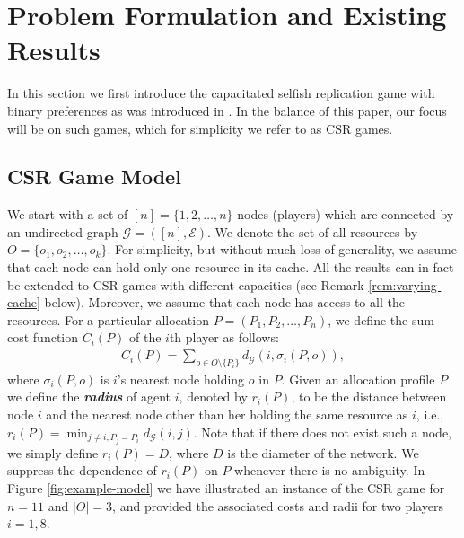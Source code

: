 
\section{Problem Formulation and Existing Results}\label{sec:game-model}

In this section we first introduce the capacitated selfish replication game with binary preferences as was introduced in \cite{gopalakrishnan2012cache}. In the balance of this paper, our focus will be on such games, which for simplicity we refer to as CSR games.

\subsection{CSR Game Model}
We start with a set of $[n]=\{1,2,\ldots,n\}$ nodes (players) which are connected by an undirected graph $\mathcal{G}=([n], \mathcal{E})$. We denote the set of all resources by $O=\{o_1, o_2,\ldots, o_k\}$. For simplicity, but without much loss of generality, we assume that each node can hold only one resource in its cache. All the results can in fact be extended to CSR games with different capacities (see Remark \ref{rem:varying-cache} below). Moreover, we assume that each node has access to all the resources. For a particular allocation $P=(P_1, P_2, \ldots, P_n)$, we define the sum cost function $C_i(P)$ of the $i$th player as follows:
\begin{align}\label{eq:CSR-cost-formulation}
C_i(P)=\sum_{o\in O\setminus \{P_i\}}d_{\mathcal{G}}(i, \sigma_i(P,o)),
\end{align}
where $\sigma_i(P,o)$ is $i$'s nearest node holding $o$ in $P$. Given an allocation profile $P$ we define the {\bf\textit{radius}} of agent $i$, denoted by $r_i(P)$, to be the distance between node $i$ and the nearest node other than her holding the same resource as $i$, i.e., $r_i(P)=\min_{ j\neq i, P_j=P_i}d_{\mathcal{G}}(i,j)$. Note that if there does not exist such a node, we simply define $r_i(P)=D$, where $D$ is the diameter of the network. We suppress the dependence of $r_i(P)$ on $P$ whenever there is no ambiguity. In Figure \ref{fig:example-model} we have illustrated an instance of the CSR game for $n=11$ and $|O|=3$, and provided the associated costs and radii for two players $i=1,8$.

